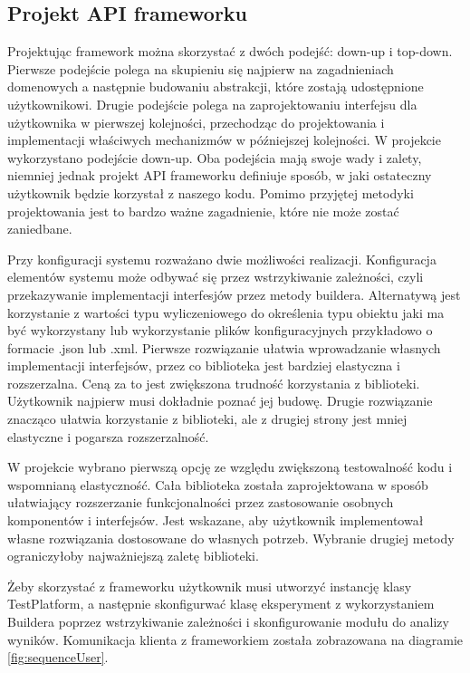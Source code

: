 \documentclass[12pt]{article}
\begin{document}
\subsection{Projekt API frameworku}

Projektując framework można skorzystać z dwóch podejść: down-up i top-down. Pierwsze podejście polega na skupieniu się najpierw na zagadnieniach domenowych a następnie budowaniu abstrakcji, które zostają udostępnione użytkownikowi. Drugie podejście polega na zaprojektowaniu interfejsu dla użytkownika w pierwszej kolejności, przechodząc do projektowania i implementacji właściwych mechanizmów w późniejszej kolejności. W projekcie wykorzystano podejście down-up. Oba podejścia mają swoje wady i zalety, niemniej jednak projekt API frameworku definiuje sposób, w jaki ostateczny użytkownik będzie korzystał z naszego kodu. Pomimo przyjętej metodyki projektowania jest to bardzo ważne zagadnienie, które nie może zostać zaniedbane. 

Przy konfiguracji systemu rozważano dwie możliwości realizacji. Konfiguracja elementów systemu może odbywać się przez wstrzykiwanie zależności, czyli przekazywanie implementacji interfesjów przez metody buildera. Alternatywą jest korzystanie z wartości typu wyliczeniowego do określenia typu obiektu jaki ma być wykorzystany lub wykorzystanie plików konfiguracyjnych przykładowo o formacie .json lub .xml. Pierwsze rozwiązanie ułatwia wprowadzanie własnych implementacji interfejsów, przez co biblioteka jest bardziej elastyczna i rozszerzalna. Ceną za to jest zwiększona trudność korzystania z biblioteki. Użytkownik najpierw musi dokładnie poznać jej budowę. Drugie rozwiązanie znacząco ułatwia korzystanie z biblioteki, ale z drugiej strony jest mniej elastyczne i pogarsza rozszerzalność. 

W projekcie wybrano pierwszą opcję ze względu zwiększoną testowalność kodu i wspomnianą elastyczność. Cała biblioteka została zaprojektowana w sposób ułatwiający rozszerzanie funkcjonalności przez zastosowanie osobnych komponentów i interfejsów. Jest wskazane, aby użytkownik implementował własne rozwiązania dostosowane do własnych potrzeb. Wybranie drugiej metody ograniczyłoby najważniejszą zaletę biblioteki.

Żeby skorzystać z frameworku użytkownik musi utworzyć instancję klasy TestPlatform, a następnie skonfigurwać klasę eksperyment z wykorzystaniem Buildera poprzez wstrzykiwanie zależności i skonfigurowanie modułu do analizy wyników. Komunikacja klienta z frameworkiem została zobrazowana na diagramie \ref{fig:sequenceUser}.
\end{document}
